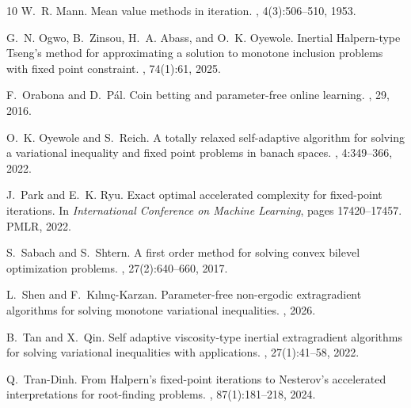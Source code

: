 \documentclass{article}
\theoremstyle{plain}
\theoremstyle{definition}
\newcommand{\0}{\boldsymbol{0}}
\begin{document}
\begin{thebibliography}{10}
W.~R. Mann.
\newblock Mean value methods in iteration.
,
  4(3):506--510, 1953.

G.~N. Ogwo, B.~Zinsou, H.~A. Abass, and O.~K. Oyewole.
\newblock Inertial {H}alpern-type {T}seng’s method for approximating a
  solution to monotone inclusion problems with fixed point constraint.
,
  74(1):61, 2025.

F.~Orabona and D.~P{\'a}l.
\newblock Coin betting and parameter-free online learning.
, 29, 2016.

O.~K. Oyewole and S.~Reich.
\newblock A totally relaxed self-adaptive algorithm for solving a variational
  inequality and fixed point problems in banach spaces.
, 4:349--366, 2022.

J.~Park and E.~K. Ryu.
\newblock Exact optimal accelerated complexity for fixed-point iterations.
\newblock In {\em International Conference on Machine Learning}, pages
  17420--17457. PMLR, 2022.

S.~Sabach and S.~Shtern.
\newblock A first order method for solving convex bilevel optimization
  problems.
, 27(2):640--660, 2017.

L.~Shen and F.~K{\i}l{\i}n{\c{c}}-Karzan.
\newblock Parameter-free non-ergodic extragradient algorithms for solving
  monotone variational inequalities.
, 2026.

B.~Tan and X.~Qin.
\newblock Self adaptive viscosity-type inertial extragradient algorithms for
  solving variational inequalities with applications.
, 27(1):41--58, 2022.

Q.~Tran-Dinh.
\newblock From {H}alpern's fixed-point iterations to {N}esterov's accelerated
  interpretations for root-finding problems.
, 87(1):181--218, 2024.

\end{thebibliography}
\end{document}
